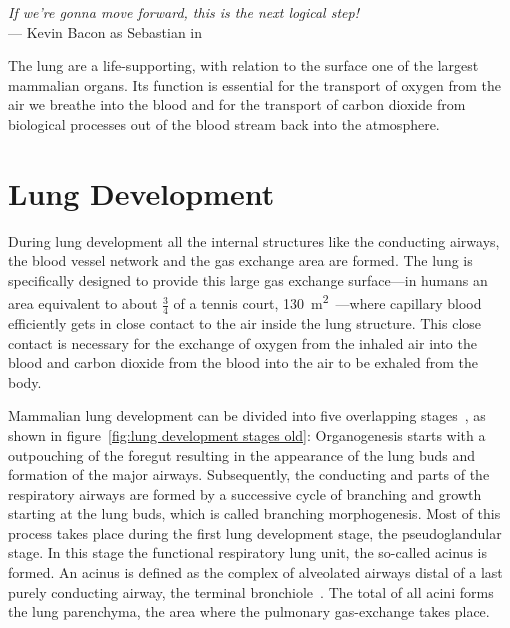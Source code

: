 \acresetall
{}\label{ch:lung}
\begin{flushright}{\slshape If we're gonna move forward, this is the next logical step!} \\ \medskip
	--- Kevin Bacon as Sebastian in \citep{HollowMan}
\end{flushright}
\vspace{52mm}

The lung are a life-supporting, with relation to the surface one of the largest mammalian organs. Its function is essential for the transport of oxygen from the air we breathe into the blood and for the transport of carbon dioxide from biological processes out of the blood stream back into the atmosphere.

\section{Lung Development}
During lung development all the internal structures like the conducting airways, the blood vessel network and the gas exchange area are formed. The lung is specifically designed to provide this large gas exchange surface---in humans an area equivalent to about $\frac{3}{4}$ of a tennis court, \SI{130}{\meter\squared}~\cite{Weibel2009}---where capillary blood efficiently gets in close contact to the air inside the lung structure. This close contact is necessary for the exchange of oxygen from the inhaled air into the blood and carbon dioxide from the blood into the air to be exhaled from the body.

Mammalian lung development can be divided into five overlapping stages~\cite{Schittny2004,Schittny2007a}, as shown in figure~\ref{fig:lung development stages old}: Organogenesis starts with a outpouching of the foregut resulting in the appearance of the lung buds and formation of the major airways. Subsequently, the conducting and parts of the respiratory airways are formed by a successive cycle of branching and growth starting at the lung buds, which is called branching morphogenesis. Most of this process takes place during the first lung development stage, the pseudoglandular stage. In this stage the functional respiratory lung unit, the so-called acinus is formed. An acinus is defined as the complex of alveolated airways distal of a last purely conducting airway, the terminal bronchiole~\cite{Rodriguez1987}. The total of all acini forms the lung parenchyma, the area where the pulmonary gas-exchange takes place.

